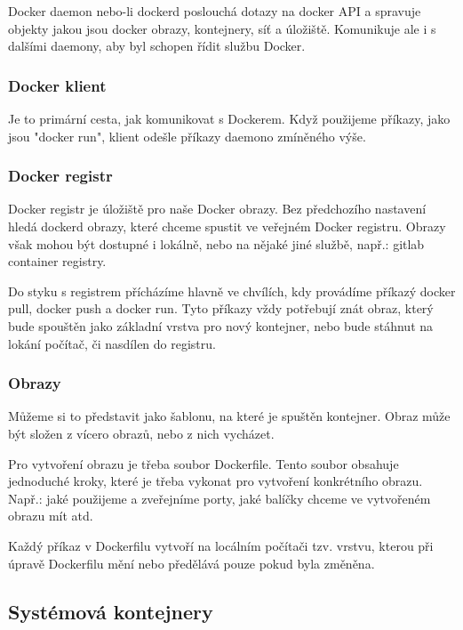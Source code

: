 Docker daemon nebo-li dockerd poslouchá dotazy na docker API a spravuje objekty jakou jsou docker obrazy, kontejnery, síť a úložiště. Komunikuje ale i s dalšími daemony, aby byl schopen řídit službu Docker.

\subsubsection{Docker klient}

Je to primární cesta, jak komunikovat s Dockerem. Když použijeme příkazy, jako jsou "docker run", klient odešle příkazy daemono zmíněného výše. 

\subsubsection{Docker registr}

Docker registr je úložiště pro naše Docker obrazy. Bez předchozího nastavení hledá dockerd obrazy, které chceme spustit ve veřejném Docker registru. Obrazy však mohou být dostupné i lokálně, nebo na nějaké jiné službě, např.: gitlab container registry. 

Do styku s registrem přícházíme hlavně ve chvílích, kdy provádíme příkazý docker pull, docker push a docker run. Tyto příkazy vždy potřebují znát obraz, který bude spouštěn jako základní vrstva pro nový kontejner, nebo bude stáhnut na lokání počítač, či nasdílen do registru.

\subsubsection{Obrazy}

Můžeme si to představit jako šablonu, na které je spuštěn kontejner. Obraz může být složen z vícero obrazů, nebo z nich vycházet. 

Pro vytvoření obrazu je třeba soubor Dockerfile. Tento soubor obsahuje jednoduché kroky, které je třeba vykonat pro vytvoření konkrétního obrazu. Např.: jaké použijeme a zveřejníme porty, jaké balíčky chceme ve vytvořeném obrazu mít atd. 

Každý příkaz v Dockerfilu vytvoří na locálním počítači tzv. vrstvu, kterou při úpravě Dockerfilu mění nebo předělává pouze pokud byla změněna. 


\subsection{Systémová kontejnery}

